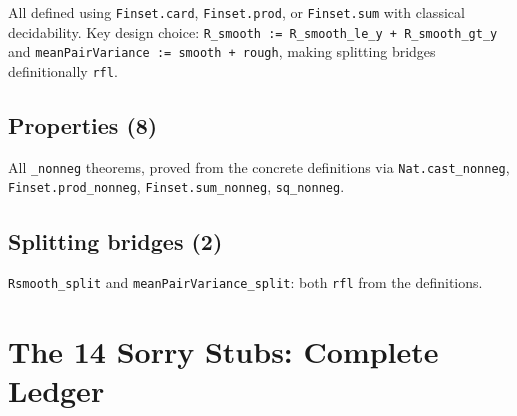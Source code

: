 \documentclass[11pt,a4paper]{article}
\begin{document}
All defined using \texttt{Finset.card}, \texttt{Finset.prod}, or \texttt{Finset.sum} with classical decidability.  Key design choice: \texttt{R\_smooth := R\_smooth\_le\_y + R\_smooth\_gt\_y} and \texttt{meanPairVariance := smooth + rough}, making splitting bridges definitionally \texttt{rfl}.

\subsection{Properties (8)}

All \texttt{\_nonneg} theorems, proved from the concrete definitions via \texttt{Nat.cast\_nonneg}, \texttt{Finset.prod\_nonneg}, \texttt{Finset.sum\_nonneg}, \texttt{sq\_nonneg}.

\subsection{Splitting bridges (2)}

\texttt{Rsmooth\_split} and \texttt{meanPairVariance\_split}: both \texttt{rfl} from the definitions.

\section{The 14 Sorry Stubs: Complete Ledger}
\end{document}
